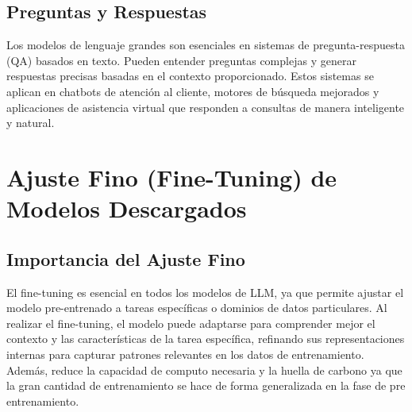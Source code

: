 \subsection{Preguntas y Respuestas}
Los modelos de lenguaje grandes son esenciales en sistemas de pregunta-respuesta (QA) basados en texto. Pueden entender preguntas complejas y generar respuestas precisas basadas en el contexto proporcionado. Estos sistemas se aplican en chatbots de atención al cliente, motores de búsqueda mejorados y aplicaciones de asistencia virtual que responden a consultas de manera inteligente y natural.
\cite{IBM-LLM}
\section{Ajuste Fino (Fine-Tuning) de Modelos Descargados}
\subsection{Importancia del Ajuste Fino}
      El fine-tuning es esencial en todos los modelos de LLM, ya que permite ajustar el modelo pre-entrenado a tareas específicas o dominios de datos particulares. Al realizar el fine-tuning, el modelo puede adaptarse para comprender mejor el contexto y las características de la tarea específica, refinando sus representaciones internas para capturar patrones relevantes en los datos de entrenamiento. Además, reduce la capacidad de computo necesaria y la huella de carbono ya que la gran cantidad de entrenamiento se hace de forma generalizada en la fase de pre entrenamiento.\cite{AWS-LLM}


